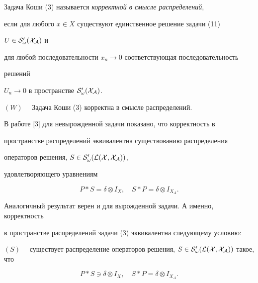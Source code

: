  


\begin{defn} 


Задача Коши (3) называется {\it корректной в смысле распределений}, 


если для любого $x\in X$ существуют единственное решение задачи (11) 


$U\in\cal S'_\omega(X_{\cal A})$ и 


для любой последовательности $x_n\to0$ соответствующая последовательность 


решений 


$U_n\to0$ в пространстве $\cal S'_\omega(X_{\cal A})$. 


\medskip


 


\noindent{}$(W)$ \ \ Задача Коши (3) корректна в смысле распределений.


\end{defn} 


 


В работе [3] для невырожденной задачи показано, что корректность в 


пространстве распределений эквивалентна существованию распределения 


операторов решения, $S\in\cal S'_\omega(\cal L(X,X_{\cal A}))$, 


удовлетворяющего уравнениям 


$$ 


P\ast S=\delta\otimes I_X,\quad S\ast P=\delta\otimes I_{X_A}. 


$$ 


 


Аналогичный результат верен и для вырожденной задачи. А именно, корректность 


в пространстве распределений задачи (3) эквивалентна следующему условию: 


\medskip


 


\noindent{}$(S)$ \ \ существует распределение операторов решения, $S\in\cal 


S'_\omega(\cal L(X,X_{\cal A}))$ такое, что 


\begin{equation} 


P\ast S\ni\delta\otimes I_X,\quad 


S\ast P=\delta\otimes I_{X_A}. 


\end{equation} 


